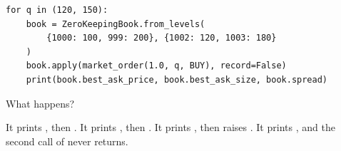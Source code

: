 \begin{question}
\begin{lstlisting}[caption={A subclass that keeps a level of size zero}, label=listing.setSizeKeepingEmptyLevelsClass]
\end{lstlisting}
\begin{lstlisting}[caption={Two market buys}, label=listing.setSizeKeepingEmptyLevelsRun]
for q in (120, 150):
    book = ZeroKeepingBook.from_levels(
        {1000: 100, 999: 200}, {1002: 120, 1003: 180}
    )
    book.apply(market_order(1.0, q, BUY), record=False)
    print(book.best_ask_price, book.best_ask_size, book.spread)
\end{lstlisting}
What happens?
\begin{choices}
 \choice It prints , then .
 \choice It prints , then .
 \choice It prints , then raises .
 \correctchoice It prints , and the second call of  never returns.
\end{choices}
\end{question}

